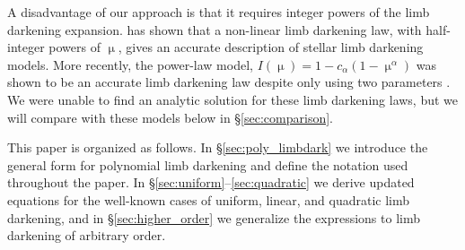 \documentclass[modern]{aastex61}
\begin{document}
A disadvantage of our approach is that it requires integer powers of the limb darkening
expansion.  \citet{Claret2000} has shown that a non-linear limb darkening law,
with half-integer powers of $\upmu$, gives an accurate description of stellar
limb darkening models.  More recently, the power-law model, $I(\upmu) = 1-
c_\alpha(1-\upmu^\alpha)$ \citep{Hestroffer1997} was shown to be an accurate
limb darkening law despite only using two parameters \citep{Morello2017,Maxted2018}.
We were unable to find an analytic solution for these limb darkening
laws, but we will compare with these models below in \S \ref{sec:comparison}.



This paper is organized as follows. In \S\ref{sec:poly_limbdark}
we introduce the general form for polynomial limb darkening
and define the notation used throughout the paper. In \S\ref{sec:uniform}--\ref{sec:quadratic}
we derive updated equations for the well-known cases of uniform, linear, and
quadratic limb darkening, and in \S\ref{sec:higher_order} we generalize the
expressions to limb darkening of arbitrary order.
\end{document}
